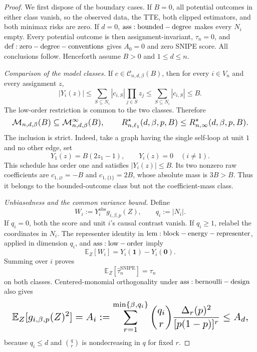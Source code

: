\documentclass{article}
\begin{document}
\begin{proof}
We first dispose of the boundary cases. If \(B=0\), all potential outcomes in either class vanish, so the observed data, the TTE, both clipped estimators, and both minimax risks are zero. If \(d=0\), \({\rm ass:bounded-degree}\) makes every \(N_i\) empty. Every potential outcome is then assignment-invariant, \(\tau_n=0\), and \({\rm def:zero-degree-conventions}\) gives \(A_0=0\) and zero SNIPE score. All conclusions follow. Henceforth assume \(B>0\) and \(1\le d\le n\).

\emph{Comparison of the model classes.} If \(c\in\mathcal C_{n,d,\beta}(B)\), then for every \(i\in V_n\) and every assignment \(z\),
\[
|Y_i(z)|
\le\sum_{S\subseteq N_i}|c_{i,S}|\prod_{j\in S}z_j
\le\sum_{S\subseteq N_i}|c_{i,S}|
\le B.
\]
The low-order restriction is common to the two classes. Therefore
\[
\makebox[\linewidth][c]{\resizebox{0.98\linewidth}{!}{\(\displaystyle \mathcal M_{n,d,\beta}(B)
\subseteq\mathcal M_{n,d,\beta}^{\infty}(B),
\qquad
R_{n,\ell_1}^{\star}(d,\beta,p,B)
\le R_{n,\infty}^{\star}(d,\beta,p,B).\)}}
\]
The inclusion is strict. Indeed, take a graph having the single self-loop at unit \(1\) and no other edge, set
\[
Y_1(z)=B(2z_1-1),
\qquad
Y_i(z)=0\quad(i\ne1).
\]
This schedule has order one and satisfies \(|Y_i(z)|\le B\). Its two nonzero raw coefficients are \(c_{1,\varnothing}=-B\) and \(c_{1,\{1\}}=2B\), whose absolute mass is \(3B>B\). Thus it belongs to the bounded-outcome class but not the coefficient-mass class.

\emph{Unbiasedness and the common variance bound.} Define
\[
W_i:=Y_i^{\mathrm{obs}}g_{i,\beta,p}(Z),
\qquad q_i:=|N_i|.
\]
If \(q_i=0\), both the score and unit \(i\)'s causal contrast vanish. If \(q_i\ge1\), relabel the coordinates in \(N_i\). The representer identity in \({\rm lem:block-energy-representer}\), applied in dimension \(q_i\), and \({\rm ass:low-order}\) imply
\[
\mathbb E_Z[W_i]=Y_i(\mathbf1)-Y_i(\mathbf0).
\]
Summing over \(i\) proves
\[
\mathbb E_Z[\widehat\tau_n^{\mathrm{SNIPE}}]=\tau_n
\]
on both classes. Centered-monomial orthogonality under \({\rm ass:bernoulli-design}\) also gives
\[
\makebox[\linewidth][c]{\resizebox{0.98\linewidth}{!}{\(\displaystyle \mathbb E_Z[g_{i,\beta,p}(Z)^2]
=A_i:=\sum_{r=1}^{\min\{\beta,q_i\}}
\binom{q_i}{r}\frac{\Delta_r(p)^2}{[p(1-p)]^r}
\le A_d,\)}}
\]
because \(q_i\le d\) and \(\binom qr\) is nondecreasing in \(q\) for fixed \(r\).


\end{proof}
\end{document}
